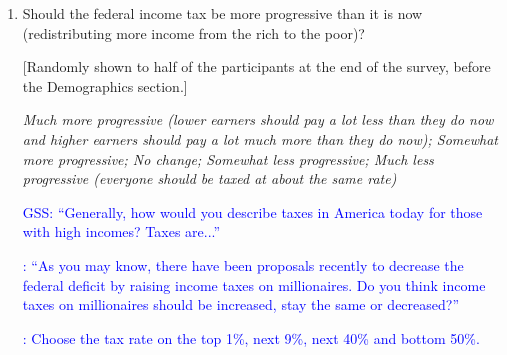 \documentclass[11pt, headsepline]{article}
\newcommand{\blue}[1]{\textcolor{blue}{#1}}
\begin{document}
\begin{enumerate}[resume]
    \blue{WVS waves 5-7: ``Please tell me for each of the following things how essential you think it is as a characteristic of democracy. \textit{Governments tax the rich and subsidize the poor.; The state makes people’s incomes equal.}''}

    \blue{GSS: ``To what extent do you agree or disagree with the following statements? \textit{Differences in income in America are too large.''}}

    \blue{GSS: ``From the following list, who do you think should have the greatest responsibility for reducing differences in income between people with high incomes and people with low incomes?''}

    \blue{GSS: ``Do you think people with high incomes should pay a larger share of their income in taxes than those with low incomes, the same share, or a smaller share?''}

    \blue{ANES: ``Favor/oppose government trying to reduce income inequality.''}

    \blue{\cite{stantcheva2021understanding}: ``Do you think that a progressive federal income tax system, in which people with higher incomes pay a higher share of income in taxes than people with lower incomes is an important tool to reduce inequality?''}
    
    \item Should the federal income tax be more progressive than it is now (redistributing more income from the rich to the poor)?

    [Randomly shown to half of the participants at the end of the survey, before the Demographics section.]

    \textit{Much more progressive (lower earners should pay a lot less than they do now and higher earners should pay a lot much more than they do now); Somewhat more progressive; No change; Somewhat less progressive; Much less progressive (everyone should be taxed at about the same rate)}

    \blue{GSS: ``Generally, how would you describe taxes in America today for those with high incomes? Taxes are...''}

    \blue{\cite{kuziemko2015elastic}: ``As you may know, there have been proposals recently to decrease the federal deficit by raising income taxes on millionaires. Do you think income taxes on millionaires should be increased, stay the same or decreased?''}

    \blue{\cite{kuziemko2015elastic}: Choose the tax rate on the top 1\%, next 9\%, next 40\% and bottom 50\%.}


\end{enumerate}
\end{document}
